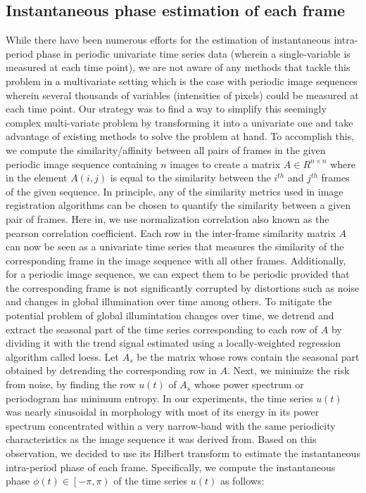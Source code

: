 \documentclass[runningheads,a4paper]{llncs}
\begin{document}
\subsection{Instantaneous phase estimation of each frame}
\label{sec:method:phase_estimation}
%
While there have been numerous efforts for the estimation of instantaneous intra-period phase\cite{Lu2013} in periodic univariate time series data (wherein a single-variable is measured at each time point), we are not aware of any methods that tackle this problem in a multivariate setting which is the case with periodic image sequences wherein several thousands of variables (intensities of pixels) could be measured at each time point. Our strategy was to find a way to simplify this seemingly complex multi-variate problem by transforming it into a univariate one and take advantage of existing methods to solve the problem at hand. To accomplish this, we compute the similarity/affinity between all pairs of frames in the given periodic image sequence containing $n$ images to create a matrix $A \in R^{n \times n}$ where in the element $A(i,j)$ is equal to the similarity between the $i^{th}$ and $j^{th}$ frames of the given sequence. In principle, any of the similarity metrics used in image registration algorithms can be chosen to quantify the similarity between a given pair of frames. Here in, we use normalization correlation also known as the pearson correlation coefficient. Each row in the inter-frame similarity matrix $A$ can now be seen as a univariate time series that measures the similarity of the corresponding frame in the image sequence with all other frames. Additionally, for a periodic image sequence, we can expect them to be periodic provided that the corresponding frame is not significantly corrupted by distortions such as noise and changes in global illumination over time among others. To mitigate the potential problem of global illumintation changes over time, we detrend and extract the seasonal part of the time series corresponding to each row of $A$ by dividing it with the trend signal estimated using a locally-weighted regression algorithm called loess\cite{Cleveland1990}. Let $A_s$ be the matrix whose rows contain the seasonal part obtained by detrending the corresponding row in $A$. Next, we minimize the risk from noise, by finding the row $u(t)$ of $A_s$ whose power spectrum or periodogram has minimum entropy. In our experiments, the time series $u(t)$ was nearly sinusoidal in morphology with most of its energy in its power spectrum concentrated within a very narrow-band with the same periodicity characteristics as the image sequence it was derived from. Based on this observation, we decided to use its Hilbert transform \cite{Lu2013} to estimate the instantaneous intra-period phase  of each frame. Specifically, we compute the instantaneous phase $\phi(t) \in \left [  -\pi, \pi\right )$ of the time series $u(t)$ as follows:
\end{document}
